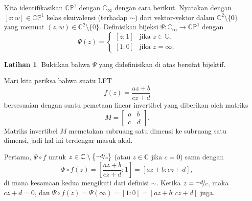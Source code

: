 \documentclass[12pt,openany]{book}
\newcommand{\C}{{\mathbb{C}}}
\newcommand{\bP}{{\mathbb{P}}}
\theoremstyle{plain}
\theoremstyle{remark}
\theoremstyle{definition}
\newenvironment{exbox}{%
    \def\FrameCommand{\vrule width 1pt \relax\hspace{10pt}}%
    \MakeFramed{\advance\hsize-\width\FrameRestore}%
}{%
    \endMakeFramed
}
\theoremstyle{exercise}
\newtheorem{exercise}{Latihan}[section]
\theoremstyle{example}
\begin{document}
Kita identifikasikan $\C\bP^1$ dengan $\C_\infty$ dengan cara
berikut.  Nyatakan dengan
%
$[z:w] \in \C \bP^1$
kelas ekuivalensi (terhadap $\sim$) dari vektor-vektor dalam $\C^2 \setminus \{0\}$
yang memuat $(z,w) \in \C^2 \setminus \{0\}$.
Definisikan bijeksi $\Psi \colon \C_\infty \to \C \bP^1$ dengan
\begin{equation*}
\Psi(z) =
\begin{cases}
[z:1] & \text{jika } z \in \C , \\
[1:0] & \text{jika } z=\infty .
\end{cases}
\end{equation*}

\begin{exbox}
\begin{exercise}
Buktikan bahwa $\Psi$ yang didefinisikan di atas bersifat bijektif.
\end{exercise}
\end{exbox}

Mari kita periksa bahwa suatu LFT
\begin{equation*}
f(z) = \frac{a z + b}{c z + d}
\end{equation*}
bersesuaian dengan suatu pemetaan linear invertibel yang diberikan oleh matriks
\begin{equation*}
M =
\begin{bmatrix}
a & b \\
c & d
\end{bmatrix} .
\end{equation*}
Matriks invertibel $M$ memetakan subruang satu dimensi ke subruang satu dimensi,
jadi hal ini terdengar masuk akal.

Pertama, $\Psi \circ f$ untuk $z \in \C \setminus \bigl\{ \nicefrac{-d}{c} \bigr\}$
(atau $z \in \C$ jika $c=0$)
sama dengan
\begin{equation*}
\Psi \circ f(z) =
\left[\frac{a z + b}{c z + d}: 1 \right]
=
\left[a z + b: c z + d \right] ,
\end{equation*}
di mana kesamaan kedua mengikuti dari definisi $\sim$.
Ketika $z = \nicefrac{-d}{c}$, maka $cz+d = 0$, dan
$\Psi\circ f(z) = \Psi(\infty) = [1:0] = [az+b : cz+d]$ juga.
\end{document}
